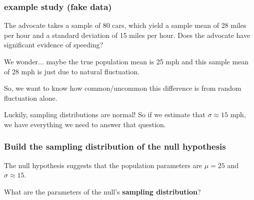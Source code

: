 \begin{frame}
\frametitle{example study (fake data)}
The advocate takes a sample of 80 cars, which yield a sample mean of 28 miles per hour and a standard deviation of 15 miles per hour. Does the advocate have significant evidence of speeding? \pause

We wonder... maybe the true population mean is 25 mph and this sample mean of 28 mph is just due to natural fluctuation. \pause

So, we want to know how common/uncommon this difference is from random fluctuation alone. \pause

Luckily, sampling distributions are normal! So if we estimate that $\sigma \approx 15$ mph, we have everything we need to answer that question.
\end{frame}


\begin{frame}
\frametitle{Build the sampling distribution of the null hypothesis}
The null hypothesis suggests that the population parameters are $\mu = 25$ and $\sigma \approx 15$. \pause

What are the parameters of the null's {\bf sampling distribution}?
 \pause
{}

\end{frame}










